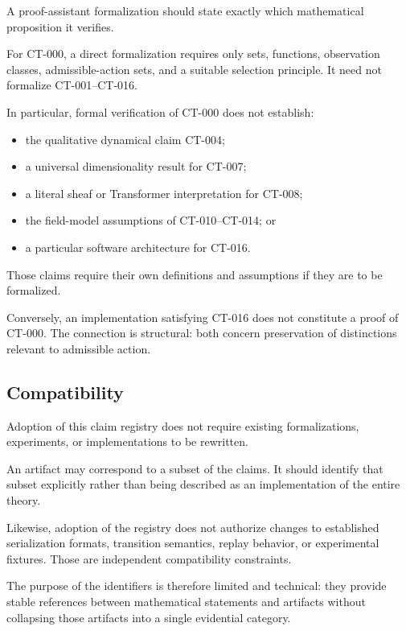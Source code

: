 \documentclass[11pt]{article}
\theoremstyle{definition}
\theoremstyle{remark}
\begin{document}
A proof-assistant formalization should state exactly which mathematical
proposition it verifies.

For CT-000, a direct formalization requires only sets, functions,
observation classes, admissible-action sets, and a suitable selection
principle. It need not formalize CT-001--CT-016.

In particular, formal verification of CT-000 does not establish:

\begin{itemize}
  \item the qualitative dynamical claim CT-004;
  \item a universal dimensionality result for CT-007;
  \item a literal sheaf or Transformer interpretation for CT-008;
  \item the field-model assumptions of CT-010--CT-014; or
  \item a particular software architecture for CT-016.
\end{itemize}

Those claims require their own definitions and assumptions if they are to be
formalized.

Conversely, an implementation satisfying CT-016 does not constitute a proof
of CT-000. The connection is structural: both concern preservation of
distinctions relevant to admissible action.

\subsection{Compatibility}

Adoption of this claim registry does not require existing formalizations,
experiments, or implementations to be rewritten.

An artifact may correspond to a subset of the claims. It should identify that
subset explicitly rather than being described as an implementation of the
entire theory.

Likewise, adoption of the registry does not authorize changes to established
serialization formats, transition semantics, replay behavior, or experimental
fixtures. Those are independent compatibility constraints.

The purpose of the identifiers is therefore limited and technical: they
provide stable references between mathematical statements and artifacts
without collapsing those artifacts into a single evidential category.

\end{document}
